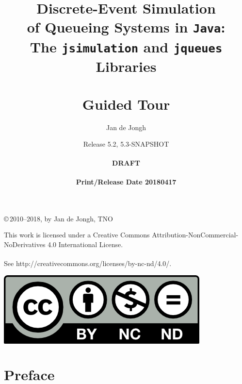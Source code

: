 \documentclass[12pt]{book}
\title{Discrete-Event Simulation\\
       of Queueing Systems in \texttt{Java}:\\
       The \texttt{jsimulation}
       and
       \texttt{jqueues}
       Libraries\\
       \mbox{ } \\
       Guided Tour}
\author{Jan de Jongh}
\date{Release 5.2, 5.3-SNAPSHOT\\
	  \mbox{ } \\
	  {\bf DRAFT}\\
	  \mbox{ }
	  \\{\bf Print/Release Date 20180417}}
\begin{document}
\maketitle

{%
	\vspace*{130mm}
	\thispagestyle{empty}
	\setlength{\parindent}{0pt}
	\copyright\,2010--2018, by Jan de Jongh, TNO
	\vspace*{40mm}
}%

\begin{mdframed}[
  outerlinecolor=black,
  outerlinewidth=2pt,
  linecolor=cccolor,
  middlelinewidth=3pt,
  roundcorner=10pt]
This work is licensed under a Creative Commons
  Attribution-NonCommercial-NoDerivatives
  4.0 International License.\\
  \\
See http://creativecommons.org/licenses/by-nc-nd/4.0/.
  \\
\begin{center}
  \includegraphics[scale=2]{fig/by-nc-nd}
\end{center}
\end{mdframed}



\chapter*{Preface}
\label{chap:preface}

\end{document}
